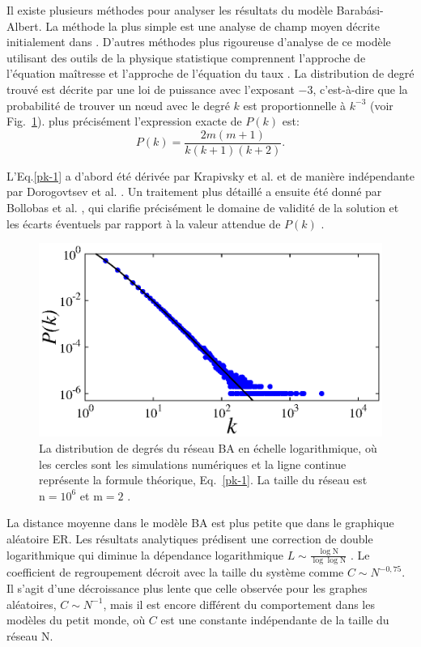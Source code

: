 Il existe plusieurs méthodes pour analyser les résultats du modèle Barabási-Albert.
La méthode la plus simple est une analyse de champ moyen décrite initialement dans \cite{BA1999}.
D'autres méthodes plus rigoureuse d'analyse de ce modèle utilisant des outils de la physique statistique comprennent l'approche de l'équation maîtresse \cite{Dorogovtsev-al2000} et l'approche de l'équation du taux \cite{Krapivsky-al2000}. La distribution de degré trouvé est décrite par une loi de puissance avec l'exposant $-3$, c'est-à-dire que la probabilité de trouver un nœud avec le degré $k$ est proportionnelle à $k^{-3}$ (voir Fig.~\ref{BA-distribution}). plus précisément l'expression exacte de $P(k)$ est:
\begin{equation}
 P(k)=\dfrac{2m(m+1)}{k(k+1)(k+2)}.
\label{pk-1}
\end{equation}

L'Eq.\ref{pk-1} a d'abord été dérivée par Krapivsky et al. \cite{Krapivsky-al2000} et de manière indépendante par Dorogovtsev et al. \cite{Dorogovtsev-al2000-2}. Un traitement plus détaillé a ensuite été donné par Bollobas et al. \cite{Bollobas-Riordan2002}, qui clarifie précisément le domaine de validité de la solution et les écarts éventuels par rapport à la valeur attendue de  $P(k)$ .

\begin{figure}[h!]
	\centering
	\includegraphics[scale=1]{./figures/fig-barabasi}
	\caption{La distribution de degrés du réseau BA en échelle logarithmique, où les cercles sont les simulations numériques et la ligne continue représente la formule théorique, Eq.~\ref{pk-1}. La taille du réseau est $\mathrm{n}=10^{6}$ et $\mathrm{m}=2$ .}	
	\label{BA-distribution}
\end{figure} 

La distance moyenne dans le modèle BA est plus petite que dans le graphique aléatoire ER. Les résultats analytiques prédisent une correction de double logarithmique qui diminue la dépendance logarithmique $ L\sim\frac{\log \mathrm{N}}{\log\log\mathrm{N} }$ \cite{Bollobas-Riordan2002}. Le coefficient de regroupement décroit avec la taille du système comme $C\sim N^{-0,75}$. Il s'agit d'une décroissance plus lente que celle observée pour les graphes aléatoires, $C\sim N^{-1}$, mais il est encore différent du comportement dans les modèles du petit monde, où $C$ est une constante indépendante de la taille du réseau $\mathrm{N}$.
